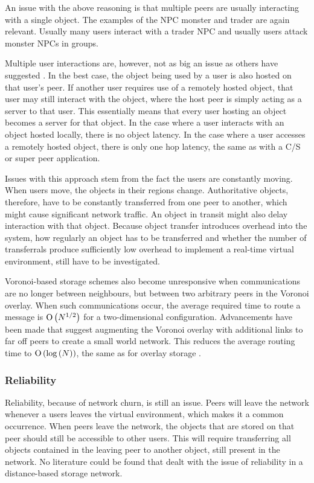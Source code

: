 An issue with the above reasoning is that multiple peers are usually interacting with a single object. The examples of the NPC monster and trader are again relevant. Usually many users interact with a trader NPC and usually users attack monster NPCs in groups.

Multiple user interactions are, however, not as big an issue as others have suggested \cite{Fan_deisgn_issues_p2p}. In the best case, the object being used by a user is also hosted on that user's peer. If another user requires use of a remotely hosted object, that user may still interact with the object, where the host peer is simply acting as a server to that user. This essentially means that every user hosting an object becomes a server for that object. In the case where a user interacts with an object hosted locally, there is no object latency. In the case where a user
accesses a remotely hosted object, there is only one hop latency, the same as with a C/S or super peer application.

Issues with this approach stem from the fact the users are constantly moving. When users move, the objects in their regions change. Authoritative objects, therefore, have to be constantly transferred from one peer to another, which might cause significant network traffic. An object in transit might also delay interaction with that object. Because object transfer introduces overhead into the system, how regularly an object has to be transferred and whether the number of transferrals produce sufficiently low overhead to implement a real-time virtual environment, still have to be investigated.

Voronoi-based storage schemes also become unresponsive when communications are no longer between neighbours, but between two arbitrary peers in the
Voronoi overlay. When such communications occur, the average required time to route a message is $\operatorname{O}\left(N^{1/2}\right)$ for a two-dimensional configuration.
Advancements have been made that suggest augmenting the Voronoi overlay with additional links to far off peers to create a small world network. This
reduces the average routing time to $\operatorname{O}\left(\log{(N)}\right)$, the same as for overlay storage \cite{Steiner_voronoi_shortcuts}.

\subsubsection{Reliability}

Reliability, because of network churn, is still an issue. Peers will leave the network whenever a users leaves the virtual environment, which makes it a common occurrence. When peers leave the network, the objects that are stored on that peer should still be accessible to other users. This will require transferring all objects contained in the leaving peer to another object, still present in the network. No literature could be found that dealt with the issue of reliability in a distance-based storage network.

